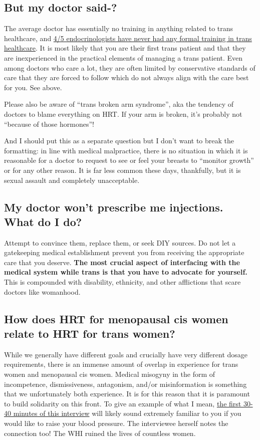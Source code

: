 \documentclass{article}
\begin{document}
{{\subsection{But my doctor said-?}

The average doctor has essentially no training in anything related to trans healthcare, and \href{https://www.endocrine.org/news-and-advocacy/news-room/2017/endocrinologists-want-training-in-transgender-care }{4/5 endocrinologists have never had any formal training in trans healthcare}. It is most likely that you are their first trans patient and that they are inexperienced in the practical elements of managing a trans patient. Even among doctors who care a lot, they are often limited by conservative standards of care that they are forced to follow which do not always align with the care best for you. See above.

Please also be aware of “trans broken arm syndrome”, aka the tendency of doctors to blame everything on HRT. If your arm is broken, it's probably not “because of those hormones”!

And I should put this as a separate question but I don't want to break the formatting: in line with medical malpractice, there is no situation in which it is reasonable for a doctor to request to see or feel your breasts to “monitor growth” or for any other reason. It is far less common these days, thankfully, but it is sexual assault and completely unacceptable.

\subsection{My doctor won’t prescribe me injections. What do I do?}

Attempt to convince them, replace them, or seek DIY sources. Do not let a gatekeeping medical establishment prevent you from receiving the appropriate care that you deserve. \textbf{The most crucial aspect of interfacing with the medical system while trans is that you have to advocate for yourself. }This is compounded with disability, ethnicity, and other afflictions that scare doctors like womanhood.

\subsection{How does HRT for menopausal cis women relate to HRT for trans women?}\label{11-29}

While we generally have different goals and crucially have very different dosage requirements, there is an immense amount of overlap in experience for trans women and menopausal cis women. Medical misogyny in the form of incompetence, dismissiveness, antagonism, and/or misinformation is something that we unfortunately both experience. It is for this reason that it is paramount to build solidarity on this front. To give an example of what I mean, \href{https://www.youtube.com/watch?v=W0XW6av2wLQ}{the first 30-40 minutes of this interview} will likely sound extremely familiar to you if you would like to raise your blood pressure. The interviewee herself notes the connection too! The WHI ruined the lives of countless women.

}}
\end{document}

